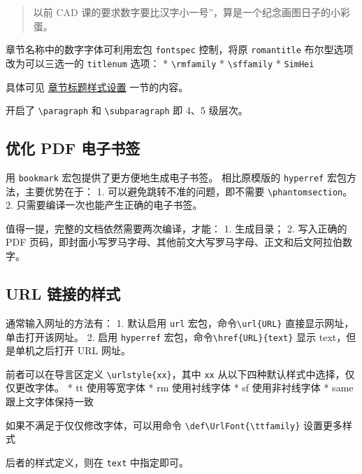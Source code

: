 \documentclass[../Main/thesis.tex]{subfiles}
\begin{document}
\begin{quote}
以前 CAD 课的要求数字要比汉字小一号''，算是一个纪念画图日子的小彩蛋。
\end{quote}

章节名称中的数字字体可利用宏包 \texttt{fontspec} 控制，将原
\texttt{romantitle} 布尔型选项改为可以三选一的 \texttt{titlenum} 选项：
* \texttt{\textbackslash{}rmfamily} * \texttt{\textbackslash{}sffamily}
* \texttt{SimHei}

具体可见
\protect\hyperlink{ux5cux25E7ux5cux25ABux5cux25A0ux5cux25E8ux5cux258Aux5cux2582ux5cux25E6ux5cux25A0ux5cux2587ux5cux25E9ux5cux25A2ux5cux2598ux5cux25E6ux5cux25A0ux5cux25B7ux5cux25E5ux5cux25BCux5cux258Fux5cux25E8ux5cux25AEux5cux25BEux5cux25E7ux5cux25BDux5cux25AE}{章节标题样式设置}
一节的内容。

开启了 \texttt{\textbackslash{}paragraph} 和
\texttt{\textbackslash{}subparagraph} 即 4、5 级层次。

\subsection{优化 PDF 电子书签}

用 \texttt{bookmark} 宏包提供了更方便地生成电子书签。 相比原模版的
\texttt{hyperref} 宏包方法，主要优势在于： 1.
可以避免跳转不准的问题，即不需要
\texttt{\textbackslash{}phantomsection}。 2.
只需要编译一次也能产生正确的电子书签。

值得一提，完整的文档依然需要两次编译，才能： 1. 生成目录； 2. 写入正确的
PDF
页码，即封面小写罗马字母、其他前文大写罗马字母、正文和后文阿拉伯数字。

\subsection{URL 链接的样式}

通常输入网址的方法有： 1. 默认启用 \texttt{url}
宏包，命令\texttt{\textbackslash{}url\{URL\}}
直接显示网址，单击打开该网址。 2. 启用 \texttt{hyperref}
宏包，命令\texttt{\textbackslash{}href\{URL\}\{text\}} 显示
text，但是单机之后打开 URL 网址。

前者可以在导言区定义 \texttt{\textbackslash{}urlstyle\{xx\}}，其中
\texttt{xx} 从以下四种默认样式中选择，仅仅更改字体。 * tt 使用等宽字体 *
rm 使用衬线字体 * sf 使用非衬线字体 * same 跟上文字体保持一致

如果不满足于仅仅修改字体，可以用命令
\texttt{\textbackslash{}def\textbackslash{}UrlFont\{\textbackslash{}ttfamily\}}
设置更多样式

后者的样式定义，则在 \texttt{text} 中指定即可。
\end{document}
